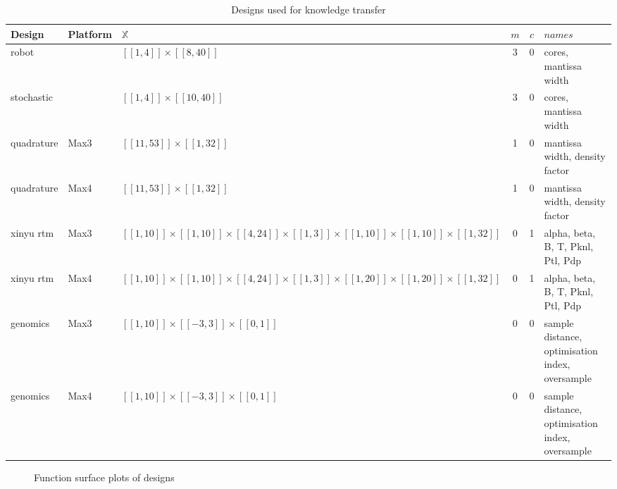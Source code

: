 \documentclass[10pt,a4paper]{article}
\newcommand{\dsb}[1]{[\![#1]\!]}
\begin{document}
\begin{table}[H]
	\begin{tabularx}{\linewidth}{X l Y c c X}
		\hline
		Design & Platform & $\mathbb{X}$ & $m$ & $c$ & $names$\\
		\hline
		robot & & $\dsb{1,4}\times\dsb{8,40}$ & 3 & 0 & cores, mantissa width\\
		stochastic & & $\dsb{1,4}\times\dsb{10,40}$ & 3 & 0 & cores, mantissa width\\
		quadrature\cite{Tse2012} & Max3 & $\dsb{11,53}\times\dsb{1,32}$ & 1 & 0 & mantissa width, density factor\\
		quadrature\cite{Tse2012} & Max4 & $\dsb{11,53}\times\dsb{1,32}$ & 1 & 0 & mantissa width, density factor\\
		xinyu rtm & Max3 & $\dsb{1,10}\times\dsb{1,10}\times\dsb{4,24}\times\dsb{1,3}\times\dsb{1,10}\times\dsb{1,10}\times\dsb{1,32}$ & 0 & 1 & alpha, beta, B, T, Pknl, Ptl, Pdp\\
		xinyu rtm & Max4 & $\dsb{1,10}\times\dsb{1,10}\times\dsb{4,24}\times\dsb{1,3}\times\dsb{1,20}\times\dsb{1,20}\times\dsb{1,32}$ & 0 & 1 & alpha, beta, B, T, Pknl, Ptl, Pdp\\
		genomics\cite{Arram2017} & Max3 & $\dsb{1,10}\times\dsb{-3,3}\times\dsb{0,1}$ & 0 & 0 & sample distance, optimisation index, oversample\\
		genomics\cite{Arram2017} & Max4 & $\dsb{1,10}\times\dsb{-3,3}\times\dsb{0,1}$ & 0 & 0 & sample distance, optimisation index, oversample\\
		\hline
 	\end{tabularx}
	\caption{Designs used for knowledge transfer}
\end{table}

\begin{figure}[H]
	 \begin{center}
	\end{center}
	\caption{Function surface plots of designs}
	\label{fig:subfigures}
\end{figure}
\end{document}
